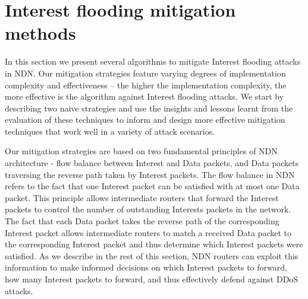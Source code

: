 \section{Interest flooding mitigation methods}
\label{sec:design}



In this section we present several algorithms to mitigate Interest flooding attacks in NDN.  Our mitigation strategies feature varying degrees of implementation complexity and effectiveness -- the higher the implementation complexity, the more effective is the algorithm against Interest flooding attacks. We start by describing two naive strategies and use the insights and lessons learnt from the evaluation of these techniques to inform and design more effective mitigation techniques that work well in a variety of attack scenarios.





Our mitigation strategies are based on two fundamental principles of NDN architecture - flow balance between Interest and Data packets, and Data packets traversing the reverse path taken by Interest packets. The flow balance in NDN refers to the fact that one Interest packet can be satisfied with at most one Data packet. This principle allows intermediate routers that forward the Interest packets to control the number of outstanding Interests packets in the network. The fact that each Data packet takes the reverse path of the corresponding Interest packet allows intermediate routers to match a received Data packet to the corresponding Interest packet and thus determine which Interest packets were satisfied. As we describe in the rest of this section,  NDN routers can exploit this information to make informed decisions on which Interest packets to forward, how many Interest packets to forward, and thus effectively defend against DDoS attacks.

